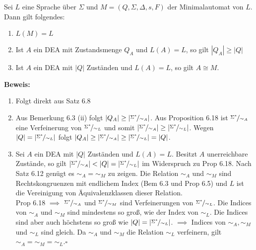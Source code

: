 \begin{satz}{}
	Sei $L$ eine Sprache über $\Sigma$ und $M = (Q, \Sigma, \Delta, s, F)$ der Minimalautomat von $L$. Dann gilt folgendes:
	\begin{enumerate}[label=(\roman*)]
		\item $L(M) = L$
		\item Ist $A$ ein DEA mit Zustandsmenge $Q_A$ und $L(A)=L$, so gilt $|Q_A| \geq |Q|$
		\item Ist $A$ ein DEA mit $|Q|$ Zuständen und $L(A)=L$, so gilt $A \cong M$.
	\end{enumerate}	 
	
	\textbf{Beweis:}
	\begin{enumerate}[label=(\roman*)]
		\item Folgt direkt aus Satz 6.8
		\item Aus Bemerkung 6.3 (ii) folgt $|Q_A| \geq |\nicefrac{\Sigma^*}{\sim_A}|$. Aus Proposition 6.18 ist $\nicefrac{\Sigma^*}{\sim_A}$ eine Verfeinerung von $\nicefrac{\Sigma^*}{\sim_L}$ und somit $|\nicefrac{\Sigma^*}{\sim_A}| \geq |\nicefrac{\Sigma^*}{\sim_L}|$. Wegen $|Q| = |\nicefrac{\Sigma^*}{\sim_L}|$ folgt $|Q_A| \geq |\nicefrac{\Sigma^*}{\sim_A}| \geq |\nicefrac{\Sigma^*}{\sim_L}| = |Q|$.
		\item Sei $A$ ein DEA mit $|Q|$ Zuständen und $L(A) = L$. Besitzt $A$ unerreichbare Zustände, so gilt $|\nicefrac{\Sigma^*}{\sim_A}| < |Q| = |\nicefrac{\Sigma^*}{\sim_L}|$ im Widerspruch zu Prop 6.18. Nach Satz 6.12 genügt es $\sim_A = \sim_M$ zu zeigen. Die Relation $\sim_A$ und $\sim_M$ sind Rechtskongruenzen mit endlichem Index (Bem 6.3 und Prop 6.5) und $L$ ist die Vereinigung von Äquivalenzklassen dieser Relation.\\
		Prop 6.18 $\implies$ $\nicefrac{\Sigma^*}{\sim_A}$ und $\nicefrac{\Sigma^*}{\sim_M}$ sind Verfeinerungen von $\nicefrac{\Sigma^*}{\sim_L}$. Die Indices von $\sim_A$ und $\sim_M$ sind mindestens so groß, wie der Index von $\sim_L$. Die Indices sind aber auch höchstens so groß wie $|Q| = |\nicefrac{\Sigma^*}{\sim_L}|$. $\implies$ Indices von $\sim_A, \sim_M$ und $\sim_L$ sind gleich. Da $\sim_A$ und $\sim_M$ die Relation $\sim_L$ verfeinern, gilt $\sim_A = \sim_M = \sim_L$.\hspace*{\fill}$\square$
	\end{enumerate}	 
\end{satz}


